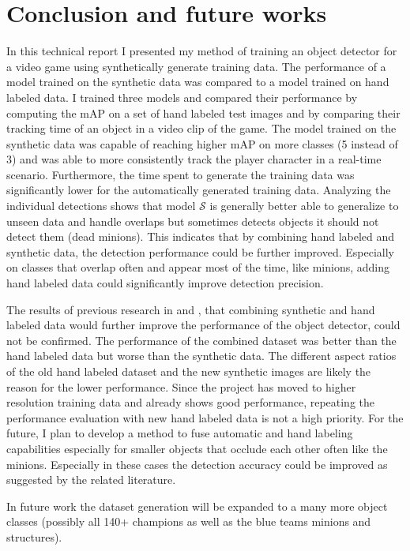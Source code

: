 \section{Conclusion and future works}
In this technical report I presented my method of training an object detector for a video game using synthetically generate training data.
The performance of a model trained on the synthetic data was compared to a model trained on hand labeled data.
I trained three models and compared their performance by computing the mAP on a set of hand labeled test images and by comparing their tracking time of an object in a video clip of the game.
The model trained on the synthetic data was capable of reaching higher mAP on more classes (5 instead of 3) and was able to more consistently track the player character in a real-time scenario.
Furthermore, the time spent to generate the training data was significantly lower for the automatically generated training data.
Analyzing the individual detections shows that model $\mathcal{S}$ is generally better able to generalize to unseen data and handle overlaps but sometimes detects objects it should not detect them (dead minions).
This indicates that by combining hand labeled and synthetic data, the detection performance could be further improved.
Especially on classes that overlap often and appear most of the time, like minions, adding hand labeled data could significantly improve detection precision.

The results of previous research in \cite{rajpura2017object} and \cite{prakash2018structured}, that combining synthetic and hand labeled data would further improve the performance of the object detector, could not be confirmed.
The performance of the combined dataset was better than the hand labeled data but worse than the synthetic data.
The different aspect ratios of the old hand labeled dataset and the new synthetic images are likely the reason for the lower performance.
Since the project has moved to higher resolution training data and already shows good performance, repeating the performance evaluation with new hand labeled data is not a high priority.
For the future, I plan to develop a method to fuse automatic and hand labeling capabilities especially for smaller objects that occlude each other often like the minions.
Especially in these cases the detection accuracy could be improved as suggested by the related literature.

In future work the dataset generation will be expanded to a many more object classes (possibly all 140+ champions as well as the blue teams minions and structures).

